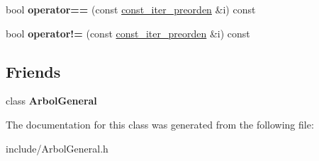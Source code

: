 \begin{DoxyCompactItemize}
\item 
bool {\bfseries operator==} (const \hyperlink{class_arbol_general_1_1const__iter__preorden}{const\+\_\+iter\+\_\+preorden} \&i) const \hypertarget{class_arbol_general_1_1const__iter__preorden_ac79a2f7ebae1c83bee2e87ac70a04c78}{}\label{class_arbol_general_1_1const__iter__preorden_ac79a2f7ebae1c83bee2e87ac70a04c78}

\item 
bool {\bfseries operator!=} (const \hyperlink{class_arbol_general_1_1const__iter__preorden}{const\+\_\+iter\+\_\+preorden} \&i) const \hypertarget{class_arbol_general_1_1const__iter__preorden_a4c639b21ed7d0773ae1b5a3692ee6edb}{}\label{class_arbol_general_1_1const__iter__preorden_a4c639b21ed7d0773ae1b5a3692ee6edb}

\end{DoxyCompactItemize}
\subsection*{Friends}
\begin{DoxyCompactItemize}
\item 
class {\bfseries Arbol\+General}\hypertarget{class_arbol_general_1_1const__iter__preorden_a9c06e31b7c3e0d4ee5b03003d32935a5}{}\label{class_arbol_general_1_1const__iter__preorden_a9c06e31b7c3e0d4ee5b03003d32935a5}

\end{DoxyCompactItemize}


The documentation for this class was generated from the following file\+:\begin{DoxyCompactItemize}
\item 
include/Arbol\+General.\+h\end{DoxyCompactItemize}

